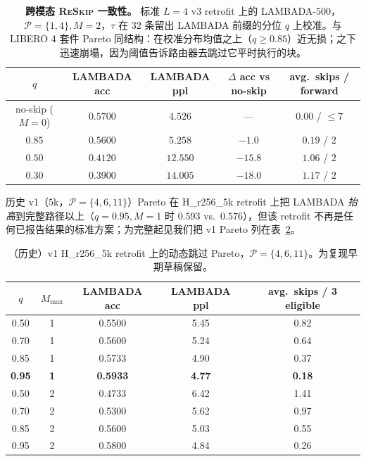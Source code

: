 \documentclass{article}
\newcommand{\reskip}{\textsc{ReSkip}}
\begin{document}
\begin{table}[h]
\caption{\textbf{跨模态 \reskip{} 一致性。} 标准 $L{=}4$ v3 retrofit 上的 LAMBADA-$500$，$\mathcal{P}{=}\{1,4\}, M{=}2$，$\tau$ 在 $32$ 条留出 LAMBADA 前缀的分位 $q$ 上校准。与 LIBERO 4 套件 Pareto 同结构：在校准分布均值之上（$q{\geq}0.85$）近无损；之下迅速崩塌，因为阈值告诉路由器去跳过它平时执行的块。}
\label{tab:retrofit_pareto}
\centering\small
\begin{tabular}{ccccc}
\toprule
$q$ & LAMBADA acc & LAMBADA ppl & $\Delta$ acc vs no-skip & avg.\ skips / forward \\
\midrule
no-skip ($M{=}0$) & $0.5700$ & $4.526$ & --- & $0.00$ / $\le 7$ \\
$0.85$ & $0.5600$ & $5.258$ & $-1.0$ & $0.19$ / $2$ \\
$0.50$ & $0.4120$ & $12.550$ & $-15.8$ & $1.06$ / $2$ \\
$0.30$ & $0.3900$ & $14.005$ & $-18.0$ & $1.17$ / $2$ \\
\bottomrule
\end{tabular}
\end{table}

历史 v1（$5$k，$\mathcal{P}{=}\{4,6,11\}$）Pareto 在 H\_r256\_5k retrofit 上把 LAMBADA \emph{抬高}到完整路径以上（$q{=}0.95, M{=}1$ 时 $0.593$ vs.\ $0.576$），但该 retrofit 不再是任何已报告结果的标准方案；为完整起见我们把 v1 Pareto 列在表~\ref{tab:retrofit_pareto_v1_legacy}。

\begin{table}[h]
\caption{（历史）v1 H\_r256\_5k retrofit 上的动态跳过 Pareto，$\mathcal{P}{=}\{4,6,11\}$。为复现早期草稿保留。}
\label{tab:retrofit_pareto_v1_legacy}
\centering\small
\begin{tabular}{ccccc}
\toprule
$q$ & $M_{\max}$ & LAMBADA acc & LAMBADA ppl & avg.\ skips / 3 eligible \\
\midrule
0.50 & 1 & 0.5500 & 5.45 & 0.82 \\
0.70 & 1 & 0.5600 & 5.24 & 0.64 \\
0.85 & 1 & 0.5733 & 4.90 & 0.37 \\
\textbf{0.95} & \textbf{1} & \textbf{0.5933} & \textbf{4.77} & \textbf{0.18} \\
0.50 & 2 & 0.4733 & 6.42 & 1.41 \\
0.70 & 2 & 0.5300 & 5.62 & 0.97 \\
0.85 & 2 & 0.5600 & 5.03 & 0.55 \\
0.95 & 2 & 0.5800 & 4.84 & 0.26 \\
\bottomrule
\end{tabular}
\end{table}
\end{document}
